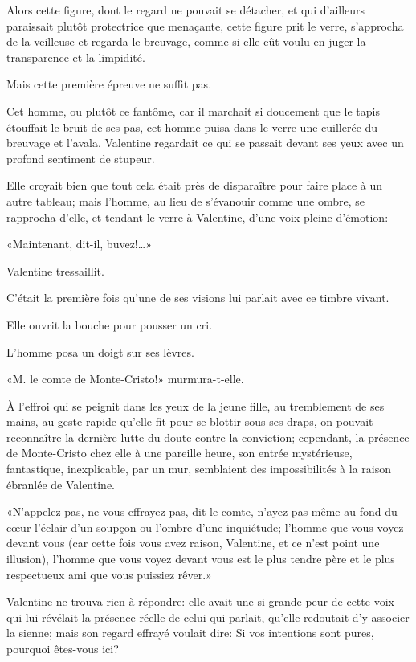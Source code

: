 Alors cette figure, dont le regard ne pouvait se détacher, et qui d'ailleurs paraissait plutôt protectrice que menaçante, cette figure prit le verre, s'approcha de la veilleuse et regarda le breuvage, comme si elle eût voulu en juger la transparence et la limpidité. 

Mais cette première épreuve ne suffit pas. 

Cet homme, ou plutôt ce fantôme, car il marchait si doucement que le tapis étouffait le bruit de ses pas, cet homme puisa dans le verre une cuillerée du breuvage et l'avala. Valentine regardait ce qui se passait devant ses yeux avec un profond sentiment de stupeur. 

Elle croyait bien que tout cela était près de disparaître pour faire place à un autre tableau; mais l'homme, au lieu de s'évanouir comme une ombre, se rapprocha d'elle, et tendant le verre à Valentine, d'une voix pleine d'émotion: 

«Maintenant, dit-il, buvez!\dots» 

Valentine tressaillit. 

C'était la première fois qu'une de ses visions lui parlait avec ce timbre vivant. 

Elle ouvrit la bouche pour pousser un cri. 

L'homme posa un doigt sur ses lèvres. 

«M. le comte de Monte-Cristo!» murmura-t-elle. 

À l'effroi qui se peignit dans les yeux de la jeune fille, au tremblement de ses mains, au geste rapide qu'elle fit pour se blottir sous ses draps, on pouvait reconnaître la dernière lutte du doute contre la conviction; cependant, la présence de Monte-Cristo chez elle à une pareille heure, son entrée mystérieuse, fantastique, inexplicable, par un mur, semblaient des impossibilités à la raison ébranlée de Valentine. 

«N'appelez pas, ne vous effrayez pas, dit le comte, n'ayez pas même au fond du cœur l'éclair d'un soupçon ou l'ombre d'une inquiétude; l'homme que vous voyez devant vous (car cette fois vous avez raison, Valentine, et ce n'est point une illusion), l'homme que vous voyez devant vous est le plus tendre père et le plus respectueux ami que vous puissiez rêver.» 

Valentine ne trouva rien à répondre: elle avait une si grande peur de cette voix qui lui révélait la présence réelle de celui qui parlait, qu'elle redoutait d'y associer la sienne; mais son regard effrayé voulait dire: Si vos intentions sont pures, pourquoi êtes-vous ici? 

